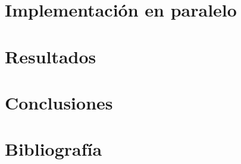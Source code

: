\documentclass[12pt,dvipsnames,a4paper,oneside]{article}
\begin{document}
\newpage
\section{Implementación en paralelo}

% 

\setcounter{table}{0}
\setcounter{equation}{0}
\setcounter{figure}{0}

\newpage
\section{Resultados}

% 


\newpage
\section{Conclusiones}

% 


\newpage
\section{Bibliografía}

\begingroup
    \renewcommand{\section}[2]{}%
     
    
\endgroup
    
\end{document}
